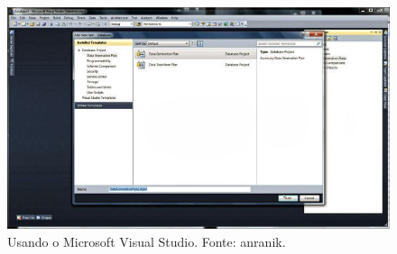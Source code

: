 \documentclass[
	12pt,				%
	openright,			%
	twoside,			%
	a4paper,			%
	english,			%
	brazil				%
	]{abntex2}
\begin{document}
	\begin{figure}
		\includegraphics[width=\linewidth]{./figures/TrabalhosRelacionados/Visual-Studio.jpg}
		\caption{Usando o Microsoft Visual Studio. Fonte: anranik.}
		\label{fig:VSDG}
	\end{figure}
\end{document}
